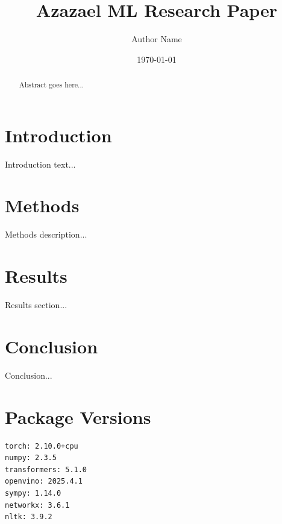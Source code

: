 \documentclass{article}
\title{Azazael ML Research Paper}
\author{Author Name}
\date{\today}
\begin{document}
\maketitle

\begin{abstract}
Abstract goes here...
\end{abstract}

\section{Introduction}
Introduction text...

\section{Methods}
Methods description...

\section{Results}
Results section...

\section{Conclusion}
Conclusion...

\section{Package Versions}
\begin{verbatim}
torch: 2.10.0+cpu
numpy: 2.3.5
transformers: 5.1.0
openvino: 2025.4.1
sympy: 1.14.0
networkx: 3.6.1
nltk: 3.9.2
\end{verbatim}



\end{document}
